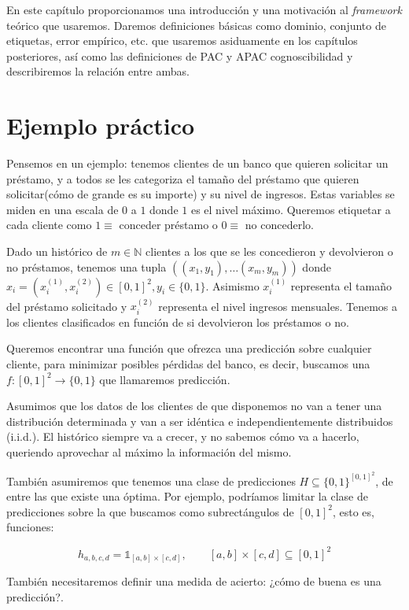 En este capítulo proporcionamos una introducción y una motivación al \textit{framework} teórico que usaremos.
Daremos definiciones básicas como dominio, conjunto de etiquetas, error empírico, etc. que
usaremos asiduamente en los capítulos posteriores, así como las definiciones de PAC y APAC cognoscibilidad y
describiremos la relación entre ambas.

\section{Ejemplo práctico}\label{sec:first-ex}
Pensemos en un ejemplo: tenemos clientes de un banco que quieren solicitar un préstamo, y a todos se les categoriza
el tamaño del préstamo que quieren solicitar(cómo de grande es su importe) y su nivel de ingresos. Estas variables se miden 
en una escala de $0$ a $1$ donde $1$ es el nivel máximo. Queremos etiquetar a cada cliente como $1\equiv$ conceder préstamo o 
$0\equiv$ no concederlo.

Dado un histórico de $m\in \mathbb{N}$ clientes a los que se les concedieron y devolvieron o no préstamos, tenemos una tupla 
$((x_1, y_1), \ldots (x_m, y_m))$ donde $x_i = (x_i^{(1)}, x_i^{(2)}) \in [0,1]^2, y_i \in \{0,1\}$. Asimismo $x_i^{(1)}$ representa el 
tamaño del préstamo solicitado y $x_i^{(2)}$ representa el nivel ingresos mensuales. Tenemos a los clientes clasificados en 
función de si devolvieron los préstamos o no.

Queremos encontrar una función que ofrezca una predicción sobre cualquier cliente, para minimizar posibles pérdidas del banco, es
decir, buscamos una $f:[0,1]^2 \rightarrow \{0,1\}$ que llamaremos predicción.

Asumimos que los datos de los clientes de que disponemos no van a tener una distribución determinada y
van a ser idéntica e independientemente distribuidos (i.i.d.). El histórico siempre va a crecer, y no sabemos cómo va a hacerlo, 
queriendo aprovechar al máximo la información del mismo.

También asumiremos que tenemos una clase de predicciones $H \subseteq \{0,1\}^{[0,1]^2}$, de entre las que existe
una óptima. Por ejemplo, podríamos limitar la clase de predicciones sobre la que buscamos como subrectángulos de $[0,1]^2$, 
esto es, funciones:

\[h_{a,b,c,d} = \mathds{1}_{[a,b]\times[c,d]}, \qquad [a,b]\times [c,d] \subseteq [0,1]^2\]


También necesitaremos definir una medida de acierto: ¿cómo de buena es una predicción?.


